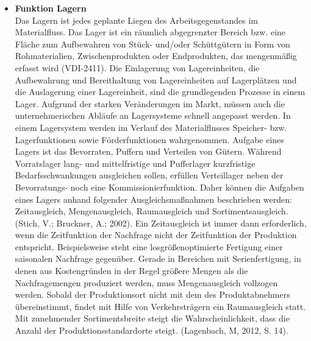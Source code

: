 \begin{itemize}
\item \textbf{Funktion Lagern} \\
Das Lagern ist jedes geplante Liegen des Arbeitsgegenstandes im Materialfluss.
Das Lager ist ein r\"aumlich abgegrenzter Bereich bzw. eine Fl\"ache zum Aufbewahren von St\"uck- und/oder Sch\"uttg\"utern in Form von Rohmaterialien, Zwischenprodukten oder Endprodukten, das mengenm\"a\ss ig erfasst wird (VDI-2411).
Die Einlagerung von Lagereinheiten, die Aufbewahrung und Bereithaltung von La\-ger\-ein\-hei\-ten auf Lagerpl\"atzen und die Auslagerung einer Lagereinheit, sind die grundlegenden Prozesse in einem Lager.
Aufgrund der starken Ver\"anderungen im Markt, m\"ussen auch die unternehmerischen Abl\"aufe an Lagersysteme schnell angepasst werden.
In einem Lagersystem werden im Verlauf des Materialflusses Speicher- bzw. Lagerfunktionen sowie F\"orderfunktionen wahrgenommen. 
Aufgabe eines Lagers ist das Bevorraten, Puffern und Verteilen von G\"utern.
W\"ahrend Vorratslager lang- und mittelfristige und Pufferlager kurzfristige Bedarfsschwankungen ausgleichen sollen, erf\"ullen Verteillager neben der Bevorratungs- noch eine Kommissionierfunktion.
Daher k\"onnen die Aufgaben eines Lagers anhand folgender Ausgleichsma\ss nahmen beschrieben werden:
Zeitausgleich, Mengenausgleich, Raumausgleich und Sortimentsausgleich. (Stich, V.; Bruckner, A.; 2002).
Ein Zeitausgleich ist immer dann erforderlich, wenn die Zeitfunktion der Nachfrage nicht der Zeitfunktion der Produktion entspricht.
Beispielsweise steht eine losgr\"o\ss enoptimierte Fertigung einer saisonalen Nachfrage gegen\"uber.
Gerade in Bereichen mit Serienfertigung, in denen aus Kostengr\"unden in der Regel gr\"o\ss ere Mengen als die Nachfragemengen produziert werden, muss Mengenausgleich vollzogen werden.
Sobald der Produktionsort nicht mit dem des Produktabnehmers \"ubereinstimmt, findet mit Hilfe von Verkehrstr\"agern ein Raumausgleich statt.
Mit zunehmender Sortimentsbreite steigt die Wahrscheinlichkeit, dass die Anzahl der Produktionsstandardorte steigt. (Lagenbach, M, 2012, S. 14).


\end{itemize}
